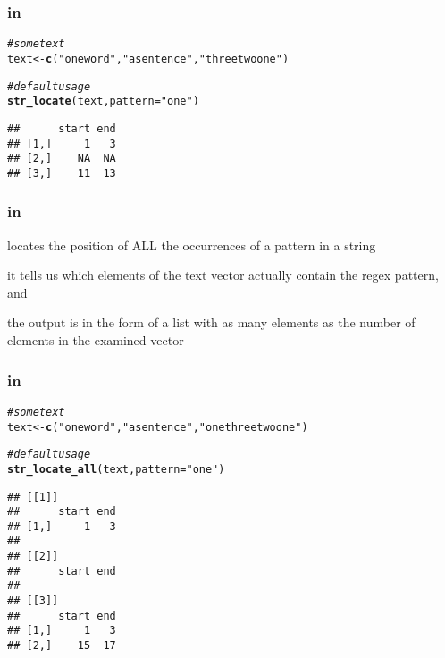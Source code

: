 \documentclass[12pt]{beamer}\usepackage[]{graphicx}\usepackage[]{color}
\makeatletter
\newcommand{\hlstr}[1]{\textcolor[rgb]{0.192,0.494,0.8}{#1}}%
\newcommand{\hlcom}[1]{\textcolor[rgb]{0.678,0.584,0.686}{\textit{#1}}}%
\newcommand{\hlstd}[1]{\textcolor[rgb]{0.345,0.345,0.345}{#1}}%
\newcommand{\hlkwb}[1]{\textcolor[rgb]{0.69,0.353,0.396}{#1}}%
\newcommand{\hlkwc}[1]{\textcolor[rgb]{0.333,0.667,0.333}{#1}}%
\newcommand{\hlkwd}[1]{\textcolor[rgb]{0.737,0.353,0.396}{\textbf{#1}}}%
\newenvironment{kframe}{%
 \def\at@end@of@kframe{}%
 \ifinner\ifhmode%
  \def\at@end@of@kframe{\end{minipage}}%
  \begin{minipage}{\columnwidth}%
 \fi\fi%
 \def\FrameCommand##1{\hskip\@totalleftmargin \hskip-\fboxsep
 \colorbox{shadecolor}{##1}\hskip-\fboxsep
     \hskip-\linewidth \hskip-\@totalleftmargin \hskip\columnwidth}%
 \MakeFramed {\advance\hsize-\width
   \@totalleftmargin\z@ \linewidth\hsize
   \@setminipage}}%
 {\par\unskip\endMakeFramed%
 \at@end@of@kframe}
\newenvironment{knitrout}{}{} %
\makeatother
\begin{document}
\begin{frame}[fragile]
\frametitle{ in }

\begin{knitrout}\footnotesize
{}\color{fgcolor}\begin{kframe}
\begin{alltt}
\hlcom{# some text}
\hlstd{text} \hlkwb{<-} \hlkwd{c}\hlstd{(}\hlstr{"one word"}\hlstd{,} \hlstr{"a sentence"}\hlstd{,} \hlstr{"three two one"}\hlstd{)}

\hlcom{# default usage}
\hlkwd{str_locate}\hlstd{(text,} \hlkwc{pattern} \hlstd{=} \hlstr{"one"}\hlstd{)}
\end{alltt}
\begin{verbatim}
##      start end
## [1,]     1   3
## [2,]    NA  NA
## [3,]    11  13
\end{verbatim}
\end{kframe}
\end{knitrout}

\end{frame}


\begin{frame}[fragile]
\frametitle{ in }

\bi
  \item {} locates the position of ALL the occurrences of a pattern in a string
  \item it tells us which elements of the text vector actually contain the regex pattern, and
 \item the output is in the form of a list with as many elements as the number of elements in the examined vector
\ei

\end{frame}


\begin{frame}[fragile]
\frametitle{ in }

\begin{knitrout}\footnotesize
{}\color{fgcolor}\begin{kframe}
\begin{alltt}
\hlcom{# some text}
\hlstd{text} \hlkwb{<-} \hlkwd{c}\hlstd{(}\hlstr{"one word"}\hlstd{,} \hlstr{"a sentence"}\hlstd{,} \hlstr{"one three two one"}\hlstd{)}

\hlcom{# default usage}
\hlkwd{str_locate_all}\hlstd{(text,} \hlkwc{pattern} \hlstd{=} \hlstr{"one"}\hlstd{)}
\end{alltt}
\begin{verbatim}
## [[1]]
##      start end
## [1,]     1   3
## 
## [[2]]
##      start end
## 
## [[3]]
##      start end
## [1,]     1   3
## [2,]    15  17
\end{verbatim}
\end{kframe}
\end{knitrout}

\end{frame}
\end{document}
